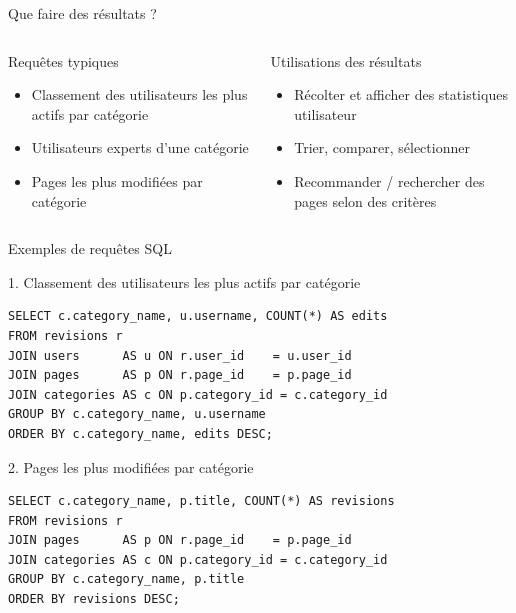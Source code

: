 \documentclass[a4paper,12pt]{beamer}
\begin{document}
\begin{frame}{Que faire des résultats ?}
    \begin{columns}[T]
        \begin{block}{Requêtes typiques}
            \begin{itemize}
                \item Classement des utilisateurs les plus actifs par catégorie
                \item Utilisateurs experts d'une catégorie
                \item Pages les plus modifiées par catégorie
            \end{itemize}
        \end{block}

        \begin{block}{Utilisations des résultats}
            \begin{itemize}
                \item Récolter et afficher des statistiques utilisateur
                \item Trier, comparer, sélectionner
                \item Recommander / rechercher des pages selon des critères
            \end{itemize}
        \end{block}
    \end{columns}
\end{frame}

\begin{frame}[fragile]{Exemples de requêtes SQL}
\scriptsize
\begin{block}{1. Classement des utilisateurs les plus actifs par catégorie}
\begin{lstlisting}
SELECT c.category_name, u.username, COUNT(*) AS edits
FROM revisions r
JOIN users      AS u ON r.user_id    = u.user_id
JOIN pages      AS p ON r.page_id    = p.page_id
JOIN categories AS c ON p.category_id = c.category_id
GROUP BY c.category_name, u.username
ORDER BY c.category_name, edits DESC;
\end{lstlisting}
\end{block}
\vspace{-0.15cm}
\begin{block}{2. Pages les plus modifiées par catégorie}
\begin{lstlisting}
SELECT c.category_name, p.title, COUNT(*) AS revisions
FROM revisions r
JOIN pages      AS p ON r.page_id    = p.page_id
JOIN categories AS c ON p.category_id = c.category_id
GROUP BY c.category_name, p.title
ORDER BY revisions DESC;
\end{lstlisting}
\end{block}
\end{frame}
\end{document}
